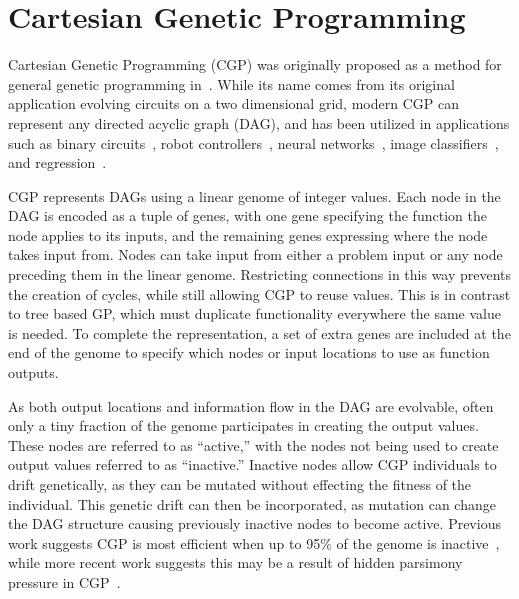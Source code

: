 \documentclass[journal]{IEEEtran}
\begin{document}

\section{Cartesian Genetic Programming}
\label{sec:cgp}
Cartesian Genetic Programming (CGP) was originally proposed as a method for general
genetic programming in~\cite{miller:2000:CGPorigin}.  While its name comes from
its original application evolving circuits on a two dimensional grid, modern CGP can
represent any directed acyclic graph (DAG), and has been utilized in applications such as binary
circuits~\cite{walker:2008:cgpmodules},
robot controllers~\cite{harding:2005:robots},
neural networks~\cite{khan:2010:cgpann},
image classifiers~\cite{harding:2012:mtcgp},
and regression~\cite{harding:2009:smcgp}.

CGP represents DAGs using a linear genome of integer values.  Each node in the
DAG is encoded as a tuple of genes, with one gene specifying the function
the node applies to its inputs, and the remaining genes expressing where the
node takes input from.  Nodes can take input from either a problem input or
any node preceding them in the linear genome.  Restricting connections in this way
prevents the creation of cycles, while still allowing CGP to reuse values.  This is
in contrast to tree based GP, which must duplicate functionality everywhere the same value is needed.
To complete the representation, a set
of extra genes are included at the end of the genome to specify which nodes or
input locations to use as function outputs.

As both output locations and information flow in the DAG are evolvable, often
only a tiny fraction of the genome participates in creating the
output values.  These nodes are referred to as ``active,'' with the nodes not
being used to create output values referred to as ``inactive.''  Inactive nodes
allow CGP individuals to drift genetically, as they can be mutated without effecting
the fitness of the individual.  This genetic drift can then be incorporated, as
mutation can change the DAG structure causing previously inactive nodes to become
active.  Previous work suggests CGP is most efficient when up to 95\% of the genome
is inactive~\cite{miller:2006:redundancy}, while more recent work suggests this may
be a result of hidden parsimony pressure in CGP~\cite{goldman:2013:ordering}.
\end{document}

